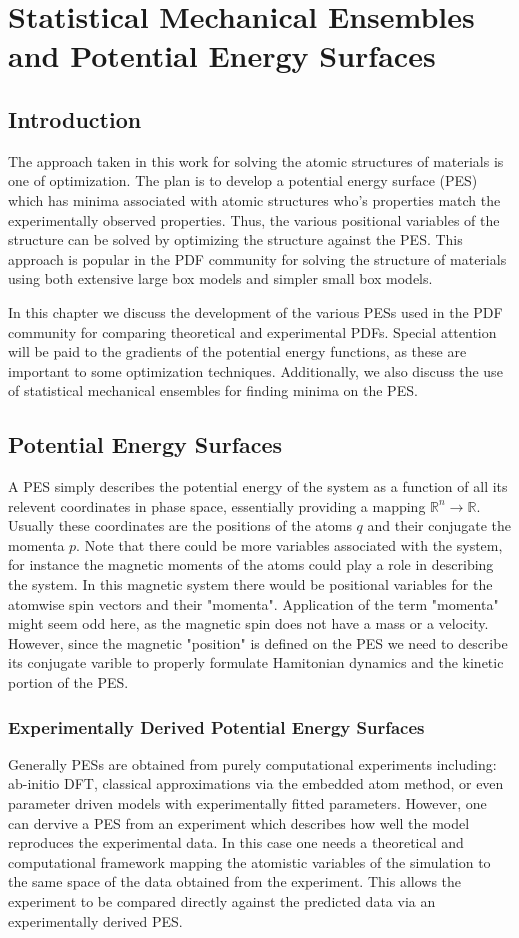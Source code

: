 \chapter{Statistical Mechanical Ensembles and Potential Energy Surfaces} \label{ch:pes_e}
\section{Introduction}
The approach taken in this work for solving the atomic structures of materials is one of optimization.
The plan is to develop a potential energy surface (PES) which has minima associated with atomic structures who's properties match the experimentally observed properties.
Thus, the various positional variables of the structure can be solved by optimizing the structure against the PES.
This approach is popular in the PDF community for solving the structure of materials using both extensive large box models and simpler small box models.

In this chapter we discuss the development of the various PESs used in the PDF community for comparing theoretical and experimental PDFs.
Special attention will be paid to the gradients of the potential energy functions, as these are important to some optimization techniques.
Additionally, we also discuss the use of statistical mechanical ensembles for finding minima on the PES.

\section{Potential Energy Surfaces} \label{sec:pes}
A PES simply describes the potential energy of the system as a function of all its relevent coordinates in phase space, essentially providing a mapping $\mathbb{R}^{n} \rightarrow \mathbb{R}$.
Usually these coordinates are the positions of the atoms $q$ and their conjugate the momenta $p$.
Note that there could be more variables associated with the system, for instance the magnetic moments of the atoms could play a role in describing the system.
In this magnetic system there would be positional variables for the atomwise spin vectors and their "momenta".
Application of the term "momenta" might seem odd here, as the magnetic spin does not have a mass or a velocity.
However, since the magnetic "position" is defined on the PES we need to describe its conjugate varible to properly formulate Hamitonian dynamics and the kinetic portion of the PES.

\subsection{Experimentally Derived Potential Energy Surfaces}
Generally PESs are obtained from purely computational experiments including: ab-initio DFT, classical approximations via the embedded atom method, or even parameter driven models with experimentally fitted parameters.
However, one can dervive a PES from an experiment which describes how well the model reproduces the experimental data.
In this case one needs a theoretical and computational framework mapping the atomistic variables of the simulation to the same space of the data obtained from the experiment.
This allows the experiment to be compared directly against the predicted data via an experimentally derived PES.

